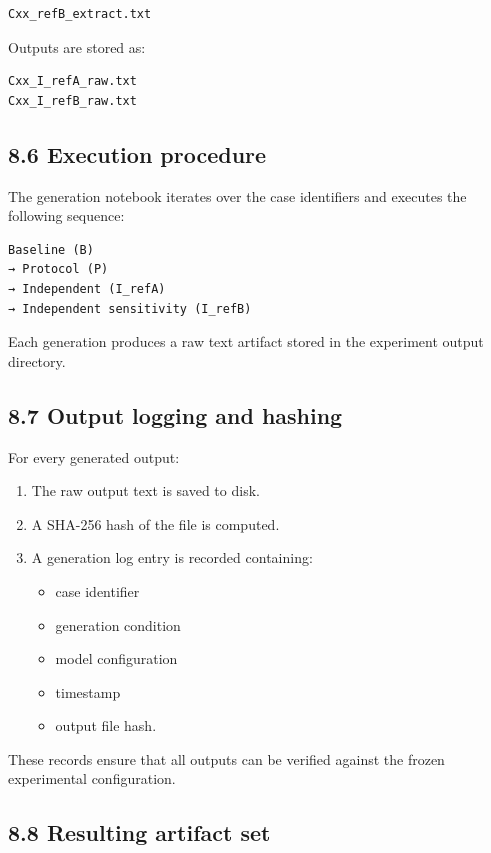{\begin{verbatim}
Cxx_refB_extract.txt
\end{verbatim}

Outputs are stored as:

\begin{verbatim}
Cxx_I_refA_raw.txt
Cxx_I_refB_raw.txt
\end{verbatim}

\subsection*{8.6 Execution procedure}

The generation notebook iterates over the case identifiers and executes the following sequence:

\begin{verbatim}
Baseline (B)
→ Protocol (P)
→ Independent (I_refA)
→ Independent sensitivity (I_refB)
\end{verbatim}

Each generation produces a raw text artifact stored in the experiment output directory.

\subsection*{8.7 Output logging and hashing}

For every generated output:

\begin{enumerate}
\item The raw output text is saved to disk.
\item A SHA-256 hash of the file is computed.
\item A generation log entry is recorded containing:
\begin{itemize}
\item case identifier
\item generation condition
\item model configuration
\item timestamp
\item output file hash.
\end{itemize}
\end{enumerate}

These records ensure that all outputs can be verified against the frozen experimental configuration.

\subsection*{8.8 Resulting artifact set}

}
